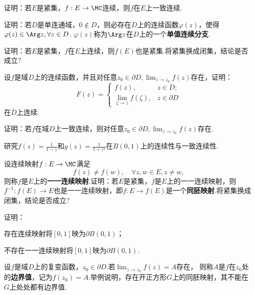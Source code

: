 \begin{xiti}\hypertarget{xiti1.7}{}
  \item 证明：若$E$是紧集，$f:E\to\MC$连续，则$f$在$E$上一致连续.
  \item 证明：若$D$是单连通域，$0\notin D$，则必存在$D$上的连续函数$\varphi(z)$，使得$\varphi(z)\in \Arg z,\forall z\in D$. $\varphi(z)$称为$\Arg z$在$D$上的一个\textbf{单值连续分支}.
  \item 证明：若$E$是紧集，$f$在$E$上连续，则$f(E)$也是紧集.将紧集换成闭集，结论是否成立?
  \item 设$f$是域$D$上的连续函数，并且对任意$z_0\in\partial D,\lim_{z\to z_0}f(z)$存在，证明：
        \[
          F(z) = \begin{cases}
                   f(z), & z\in D;\\
                   \lim_{\zeta\to z}f(\zeta), & z\in \partial D
                 \end{cases}
        \]
        在$\bar D$上连续.
  \item 证明：若$f$在域$D$上一致连续，则对任意$z_0\in\partial D,\lim_{z\to z_0}f(z)$存在.
  \item 研究$f(z)=\frac1{1-z}$和$g(z)=\frac1{1+z^2}$在$B(0,1)$上的连续性与一致连续性.
  \item \hypertarget{xiti1.7.7}{} 设连续映射$f:E\to\MC$满足
        \[
          f(z) \ne f(w),\quad \forall z,w\in E, z\ne w,
        \]
        则称$f$是$E$上的\textbf{一一连续映射}.证明：若$E$是紧集，$f$是$E$上的一一连续映射，则$f^{-1}:f(E)\to E$也是一一连续映射，即$f:E\to f(E)$是一个\textbf{同胚映射}.将紧集换成闭集，结论是否成立?
  \item 证明：
    \begin{enuma}
      \item 存在连续映射将$[0,1]$映为$\partial B(0,1)$；
      \item 不存在一一连续映射将$[0,1]$映为$\partial B(0,1)$.
    \end{enuma}
  \item 设$f$是域$D$上的复变函数，$z_0\in\partial D$.若$\lim_{z\to z_0}f(z)=A$存在，
        则称$A$是$f$在$z_0$处的\textbf{边界值}，记为$f(z_0)=A$.举例说明，存在开正方形$G$上的同胚映射，其不能在$G$上处处都有边界值.
\end{xiti}
